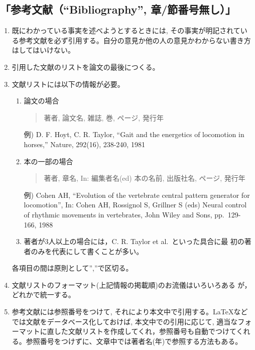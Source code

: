 \documentclass[12pt, ]{jsarticle}
\begin{document}
\hypertarget{ux53c2ux8003ux6587ux732ebibliography-ux7ae0ux7bc0ux756aux53f7ux7121ux3057}{%
\subsection{「参考文献（``Bibliography'',
章/節番号無し）」}\label{ux53c2ux8003ux6587ux732ebibliography-ux7ae0ux7bc0ux756aux53f7ux7121ux3057}}

\begin{enumerate}
\item
  既にわかっている事実を述べようとするときには,
  その事実が明記されている参考文献を必ず引用する。自分の意見か他の人の意見かわからない書き方はしてはいけない。
\item
  引用した文献のリストを論文の最後につくる。
\item
  文献リストには以下の情報が必要。

  \begin{enumerate}
  \item
    論文の場合

    \begin{quote}
    著者, 論文名, 雑誌, 巻, ページ, 発行年
    \end{quote}

    例) D. F. Hoyt, C. R. Taylor, ``Gait and the energetics of
    locomotion in horses,'' Nature, 292(16), 238-240, 1981
  \item
    本の一部の場合

    \begin{quote}
    著者, 章名, In: 編集者名(ed) 本の名前, 出版社名, ページ, 発行年
    \end{quote}

    例) Cohen AH, ``Evolution of the vertebrate central pattern
    generator for locomotion'', In: Cohen AH, Rossignol S, Grillner S
    (eds) Neural control of rhythmic movements in vertebrates, John
    Wiley and Sons, pp.~129-166, 1988
  \item
    著者が3人以上の場合には，C. R. Taylor et al.~といった具合に最
    初の著者のみを代表にして書くことが多い。
  \end{enumerate}

  各項目の間は原則として'',''で区切る。
\item
  文献リストのフォーマット(上記情報の掲載順)のお流儀はいろいろある
  が，どれかで統一する。
\item
  参考文献には参照番号をつけて,
  それにより本文中で引用する。LaTeXなどでは文献をデータベース化しておけば,
  本文中での引用に応じて,
  適当なフォーマットに直した文献リストを作成してくれ，参照番号も自動でつけてくれる。参照番号をつけずに、文章中では著者名(年)で参照する方法もある。


\end{enumerate}
\end{document}
